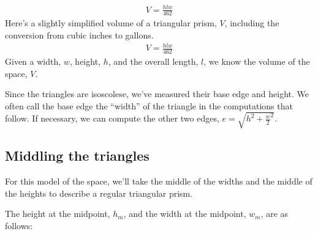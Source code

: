 \documentclass[letterpaper,10pt,english]{sphinxmanual}
\begin{document}
\begin{sphinxVerbatim}[commandchars=\\\{\}]
   
     
           
\end{sphinxVerbatim}
\begin{equation*}
\begin{split}\displaystyle V = \frac{h l w}{462}\end{split}
\end{equation*}
\sphinxAtStartPar
Here’s a slightly simplified volume of a triangular prism, \(V\), including the conversion from cubic inches to gallons.
\begin{equation}\label{equation:README:prism}
\begin{split}\displaystyle V = \frac{h l w}{462}\end{split}
\end{equation}
\sphinxAtStartPar
Given a width, \(w\), height, \(h\), and the overall length, \(l\), we know the volume of the space, \(V\).

\sphinxAtStartPar
Since the triangles are isoscolese, we’ve measured their base edge and height. We often call the base edge the “width” of the triangle in the computations that follow.
If necessary, we can compute the other two edges, \(e = \sqrt{h^2+{\frac{w}{2}}^2}\).


\subsection{Middling the triangles}
\label{\detokenize{prism:middling-the-triangles}}
\sphinxAtStartPar
For this model of the space, we’ll take the middle of the widths and the middle of the heights to describe a regular triangular prism.

\sphinxAtStartPar
The height at the  midpoint, \(h_m\), and the width at the midpoint, \(w_m\), are as follows:

\begin{sphinxVerbatim}[commandchars=\\\{\}]
\end{sphinxVerbatim}
\end{document}
